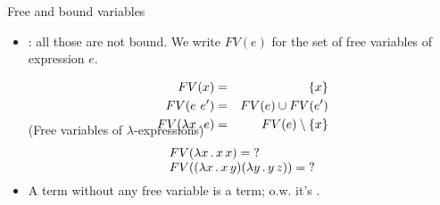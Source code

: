 \documentclass[paper=screen,mode=present,style=zysimple]{powerdot}
\begin{document}
\begin{slide}{Free and bound variables}
\begin{itemize}
\item {}: all those are not bound. We write $FV(e)$ for the set of free variables 
  of expression $e$.
\begin{wrap}
\vspace*{-0.5em}
\begin{eqnarray*}
FV(x) & = & \{{x}\} \\
FV(e \ e') & = & FV(e) \cup FV(e') \\
FV(\lambda x \, . \, e) & = & FV(e) \setminus \{{x}\} \\[-2em]
\end{eqnarray*}
\end{wrap}
\Example (Free variables of $\lambda$-expressions) 
\[
\begin{array}{l}
FV(\lambda x \ldot x \, x) = \mbox{?} \\
FV((\lambda x \ldot x \, y) (\lambda y \ldot y \, z)) = \mbox{?} \\[-0.6em] 
\end{array}
\vspace*{-1em}
\]
\item A term without any free variable is a  term; o.w. it's .
\end{itemize}
\end{slide}
\end{document}
